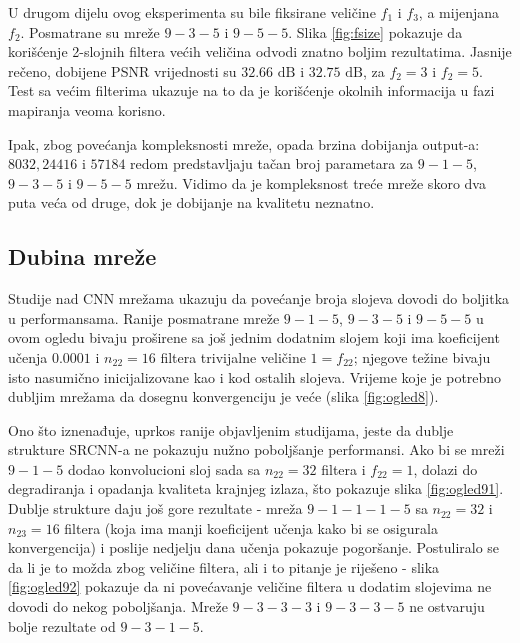 \documentclass[12pt]{report}
\numberwithin{equation}{section}
\begin{document}
  U drugom dijelu ovog eksperimenta su bile fiksirane veličine $f_1$ i $f_3$, a mijenjana $f_2$. Posmatrane su mreže $9-3-5$ i $9-5-5$. Slika \ref{fig:fsize} pokazuje da korišćenje 2-slojnih filtera većih veličina odvodi znatno boljim rezultatima. Jasnije rečeno, dobijene PSNR vrijednosti su $32.66\text{ dB}$ i $32.75\text{ dB}$, za $f_2=3$ i $f_2=5$. Test sa većim filterima ukazuje na to da je korišćenje okolnih informacija u fazi mapiranja veoma korisno. 
 
Ipak, zbog povećanja kompleksnosti mreže, opada brzina dobijanja output-a: $8032, 24416$ i $57184$ redom predstavljaju tačan broj parametara za $9-1-5$, $9-3-5$ i $9-5-5$ mrežu. Vidimo da je kompleksnost treće mreže skoro dva puta veća od druge, dok je dobijanje na kvalitetu neznatno.   

  \subsection{Dubina mreže}
   
   Studije nad CNN mrežama ukazuju da povećanje broja slojeva dovodi do boljitka u performansama. Ranije posmatrane mreže $9-1-5$, $9-3-5$ i $9-5-5$ u ovom ogledu bivaju proširene sa još jednim dodatnim slojem koji ima koeficijent učenja $0.0001$ i $n_{22}=16$ filtera trivijalne veličine $1=f_{22}$; njegove težine bivaju isto nasumično inicijalizovane kao i kod ostalih slojeva. Vrijeme koje je potrebno dubljim mrežama da dosegnu konvergenciju je veće (slika \ref{fig:ogled8}). 
   
    Ono što iznenađuje, uprkos ranije objavljenim studijama, jeste da dublje strukture SRCNN-a ne pokazuju nužno poboljšanje performansi. Ako bi se mreži $9-1-5$ dodao konvolucioni sloj sada sa $n_{22} = 32$ filtera i $f_{22}=1$, dolazi do degradiranja i opadanja kvaliteta krajnjeg izlaza, što pokazuje slika \ref{fig:ogled91}. Dublje strukture daju još gore rezultate - mreža $9-1-1-1-5$ sa $n_{22} = 32$ i $n_{23} = 16$ filtera (koja ima manji koeficijent učenja kako bi se osigurala konvergencija) i poslije nedjelju dana učenja pokazuje pogoršanje. Postuliralo se da li je to možda zbog veličine filtera, ali i to pitanje je riješeno - slika \ref{fig:ogled92} pokazuje da ni povećavanje veličine filtera u dodatim slojevima ne dovodi do nekog poboljšanja. Mreže $9-3-3-3$ i $9-3-3-5$ ne ostvaruju bolje rezultate od $9-3-1-5$.  
      
\end{document}
